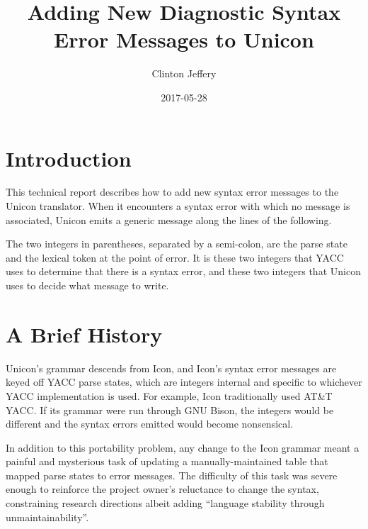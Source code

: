 \documentclass[letterpaper]{article}
\title{Adding New Diagnostic Syntax Error Messages to Unicon}
\author{Clinton Jeffery}
\date{2017-05-28}
\begin{document}
\maketitle

\section{Introduction}

This technical report describes how to add new syntax error messages
to the Unicon translator. When it encounters a syntax error with which
no message is associated, Unicon emits a generic message along the
lines of the following.


The two integers in parentheses, separated by a semi-colon, are the parse
state and the lexical token at the point of error.  It is these two
integers that YACC uses to determine that there is a syntax error, and
these two integers that Unicon uses to decide what message to write.


\section{A Brief History}

Unicon's grammar descends from Icon, and Icon's syntax error messages
are keyed off YACC parse states, which are integers internal and
specific to whichever YACC implementation is used.  For example, Icon
traditionally used AT\&T YACC. If its grammar were run through GNU
Bison, the integers would be different and the syntax errors emitted
would become nonsensical.

In addition to this portability problem, any change to the
Icon grammar meant a painful and mysterious task of updating a
manually-maintained table that mapped parse states to error messages.
The difficulty of this task was severe enough to reinforce the
project owner's reluctance to change the syntax, constraining research
directions albeit adding ``language stability through unmaintainability''.
\end{document}
